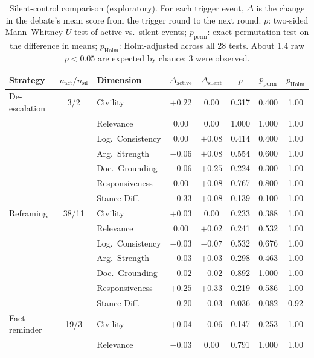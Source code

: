 \begin{table}[htbp]
\centering
\caption[Silent-control comparison (exploratory)]{Silent-control comparison (exploratory). For each trigger event, $\Delta$ is the change in the debate's mean score from the trigger round to the next round. $p$: two-sided Mann--Whitney $U$ test of active vs.\ silent events; $p_{\text{perm}}$: exact permutation test on the difference in means; $p_{\text{Holm}}$: Holm-adjusted across all 28 tests. About 1.4 raw $p < 0.05$ are expected by chance; 3 were observed.}
\label{tab:causal}
\scriptsize
\begin{tabular}{l c l cc ccc}
\toprule
\textbf{Strategy} & $n_{\text{act}}/n_{\text{sil}}$ & \textbf{Dimension} & $\Delta_{\text{active}}$ & $\Delta_{\text{silent}}$ & $p$ & $p_{\text{perm}}$ & $p_{\text{Holm}}$ \\
\midrule
De-escalation & 3/2 & Civility & $+0.22$ & $0.00$ & 0.317 & 0.400 & 1.00 \\
 &  & Relevance & $0.00$ & $0.00$ & 1.000 & 1.000 & 1.00 \\
 &  & Log.\ Consistency & $0.00$ & $+0.08$ & 0.414 & 0.400 & 1.00 \\
 &  & Arg.\ Strength & $-0.06$ & $+0.08$ & 0.554 & 0.600 & 1.00 \\
 &  & Doc.\ Grounding & $-0.06$ & $+0.25$ & 0.224 & 0.300 & 1.00 \\
 &  & Responsiveness & $0.00$ & $+0.08$ & 0.767 & 0.800 & 1.00 \\
 &  & Stance Diff. & $-0.33$ & $+0.08$ & 0.139 & 0.100 & 1.00 \\
\midrule
Reframing & 38/11 & Civility & $+0.03$ & $0.00$ & 0.233 & 0.388 & 1.00 \\
 &  & Relevance & $0.00$ & $+0.02$ & 0.241 & 0.532 & 1.00 \\
 &  & Log.\ Consistency & $-0.03$ & $-0.07$ & 0.532 & 0.676 & 1.00 \\
 &  & Arg.\ Strength & $-0.03$ & $+0.03$ & 0.298 & 0.463 & 1.00 \\
 &  & Doc.\ Grounding & $-0.02$ & $-0.02$ & 0.892 & 1.000 & 1.00 \\
 &  & Responsiveness & $+0.25$ & $+0.33$ & 0.219 & 0.586 & 1.00 \\
 &  & Stance Diff. & $-0.20$ & $-0.03$ & 0.036 & 0.082 & 0.92 \\
\midrule
Fact-reminder & 19/3 & Civility & $+0.04$ & $-0.06$ & 0.147 & 0.253 & 1.00 \\
 &  & Relevance & $-0.03$ & $0.00$ & 0.791 & 1.000 & 1.00 \\

\end{tabular}
\end{table}
